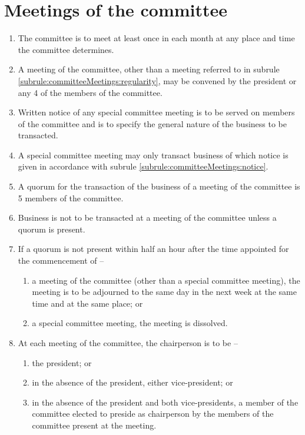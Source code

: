 \section{Meetings of the committee}
\label{rule:committeeMeetings}

\begin{enumerate}
	\item \label{subrule:committeeMeetings:regularity} The committee is to meet at least once in each month at any place and time the committee determines.
	\item \label{subrule:committeeMeetings:special} A meeting of the committee, other than a meeting referred to in subrule \ref{subrule:committeeMeetings:regularity}, may be convened by the president or any 4 of the members of the committee.
	\item \label{subrule:committeeMeetings:notice} Written notice of any special committee meeting is to be served on members of the committee and is to specify the general nature of the business to be transacted.
	\item A special committee meeting may only transact business of which notice is given in accordance with subrule \ref{subrule:committeeMeetings:notice}.
	\item A quorum for the transaction of the business of a meeting of the committee is 5 members of the committee.
	\item Business is not to be transacted at a meeting of the committee unless a quorum is present.
	
	\item If a quorum is not present within half an hour after the time appointed for the commencement of --
	\begin{enumerate}
		\item a meeting of the committee (other than a special committee meeting), the meeting is to be adjourned to the same day in the next week at the same time and at the same place; or
		\item a special committee meeting, the meeting is dissolved.
	\end{enumerate}
	
	\item At each meeting of the committee, the chairperson is to be --
	\begin{enumerate}
		\item the president; or
		\item in the absence of the president, either vice-president; or
		\item in the absence of the president and both vice-presidents, a member of the committee elected to preside as chairperson by the members of the committee present at the meeting.
	\end{enumerate}
	

\end{enumerate}
